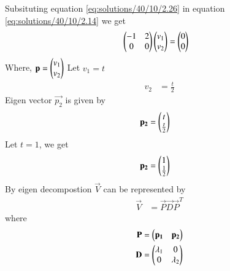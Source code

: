 Subsituting equation \ref{eq:solutions/40/10/2.26} in equation \ref{eq:solutions/40/10/2.14} we get
\begin{align}
        &   \begin{pmatrix}-1 & 2 \\ 0& 0\end{pmatrix}\begin{pmatrix}v_1 \\ v_2\end{pmatrix}=\begin{pmatrix}0 \\ 0\end{pmatrix}\label{eq:solutions/40/10/2.27}
\end{align}
Where, $\mathbf{p}=\begin{pmatrix}v_1\\v_2\end{pmatrix}$
Let $v_1=t$
\begin{align}
    v_2&=\frac{t}{2}
\end{align}
Eigen vector $\vec{p_2}$ is given by
\begin{align}
    \mathbf{p_2}&=\begin{pmatrix}t \\ \frac{t}{2}\end{pmatrix}
\end{align}
Let $t=1$, we get
\begin{align}
        \mathbf{p_2}&=\begin{pmatrix}1 \\\frac{1 }{2}\end{pmatrix}\label{eq:solutions/40/10/2.30}
\end{align}
By eigen decompostion $\vec{V}$ can be represented by
\begin{align}
    \vec{V}&=\vec{P}\vec{D}\vec{P}^T\label{eq:solutions/40/10/2.31}
\end{align}
where 
\begin{align}
        \mathbf{P}&=\begin{pmatrix}\mathbf{p_1} & \mathbf{p_2}\end{pmatrix}\label{eq:solutions/40/10/2.32}\\
    \mathbf{D}&=\begin{pmatrix}\lambda_1 & 0 \\0 & \lambda_2\end{pmatrix}\label{eq:solutions/40/10/2.33}
\end{align}

